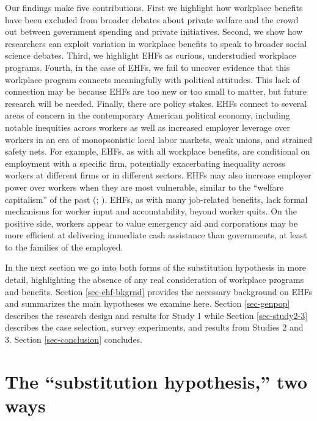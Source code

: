 \documentclass[
  11pt,
  oneside]{article}
\begin{document}
Our findings make five contributions. First we highlight how workplace benefits have been excluded from broader debates about private welfare and the crowd out between government spending and private initiatives. Second, we show how researchers can exploit variation in workplace benefits to speak to broader social science debates. Third, we highlight EHFs as curious, understudied workplace programs. Fourth, in the case of EHFs, we fail to uncover evidence that this workplace program connects meaningfully with political attitudes. This lack of connection may be because EHFs are too new or too small to matter, but future research will be needed. Finally, there are policy stakes. EHFs connect to several areas of concern in the contemporary American political economy, including notable inequities across workers as well as increased employer leverage over workers in an era of monopsonistic local labor markets, weak unions, and strained safety nets. For example, EHFs, as with all workplace benefits, are conditional on employment with a specific firm, potentially exacerbating inequality across workers at different firms or in different sectors. EHFs may also increase employer power over workers when they are most vulnerable, similar to the ``welfare capitalism'' of the past (; ). EHFs, as with many job-related benefits, lack formal mechanisms for worker input and accountability, beyond worker quits. On the positive side, workers appear to value emergency aid and corporations may be more efficient at delivering immediate cash assistance than governments, at least to the families of the employed.

In the next section we go into both forms of the substitution hypothesis in more detail, highlighting the absence of any real consideration of workplace programs and benefits. Section \ref{sec-ehf-bkgrnd} provides the necessary background on EHFs and summarizes the main hypotheses we examine here. Section \ref{sec-genpop} describes the research design and results for Study 1 while Section \ref{sec-study2-3} describes the case selection, survey experiments, and results from Studies 2 and 3. Section \ref{sec-conclusion} concludes.

\section{The ``substitution hypothesis,'' two ways}\label{sec-lit}
\end{document}

